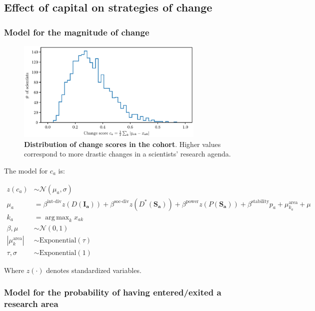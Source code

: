 \documentclass{article}
\DeclareMathOperator*{\argmax}{arg\,max}
\begin{document}
\subsection{Effect of capital on strategies of change}

\subsubsection{\label{appendix:change-model}Model for the magnitude of change}

\begin{figure}[h]
    \centering     \includegraphics[width=0.8\textwidth]{plots/Fig15.eps}
    \caption{\textbf{Distribution of change scores in the cohort}. Higher values correspond to more drastic changes in a scientists' research agenda.}    
    \label{fig:change_scores}
\end{figure}

The model for $c_a$ is:

\begin{align*}
    z(c_a) &\sim \mathcal{N}(\mu_a,\sigma)\\
    \mu_a &= \beta^{\text{int-div}} z(D(\bm{I_a}))+\beta^{\text{soc-div}}z(D^{\ast}(\bm{S_a})) + \beta^{\text{power}} z(P(\bm{S_a})) + \beta^{\text{stability}} p_a   + \mu^{\text{area}}_{k_a} + \mu\\
    k_a &= \argmax_k x_{ak}\\
    \beta,\mu &\sim \mathcal{N}(0, 1)\\
    |\mu^{\text{area}}_k| &\sim \mathrm{Exponential}(\tau)\\
    \tau,\sigma &\sim \mathrm{Exponential}(1)
\end{align*}

Where $z(\cdot)$ denotes standardized variables.

\subsubsection{\label{appendix:enter-exit-model}Model for the probability of having  entered/exited a research area}
\end{document}
